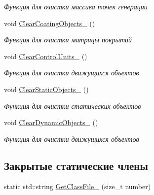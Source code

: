 \begin{DoxyCompactItemize}
\begin{DoxyCompactList}\small\item\em Функция для очистки массива точек генерации \end{DoxyCompactList}\item 
\mbox{\label{classrtm_1_1_world_controller_a8dbb12f485207fe3cddbc686b0f28797}} 
void \hyperlink{classrtm_1_1_world_controller_a8dbb12f485207fe3cddbc686b0f28797}{Clear\+Coating\+Objects\+\_\+} ()
\begin{DoxyCompactList}\small\item\em Функция для очистки матрицы покрытий \end{DoxyCompactList}\item 
\mbox{\label{classrtm_1_1_world_controller_aacf88f1ea0c2a81ed1da34a0147f32f9}} 
void \hyperlink{classrtm_1_1_world_controller_aacf88f1ea0c2a81ed1da34a0147f32f9}{Clear\+Control\+Units\+\_\+} ()
\begin{DoxyCompactList}\small\item\em Функция для очистки движущихся объектов \end{DoxyCompactList}\item 
\mbox{\label{classrtm_1_1_world_controller_a0f6b29410a02d1fa480fdec29e9b5827}} 
void \hyperlink{classrtm_1_1_world_controller_a0f6b29410a02d1fa480fdec29e9b5827}{Clear\+Static\+Objects\+\_\+} ()
\begin{DoxyCompactList}\small\item\em Функция для очистки статических объектов \end{DoxyCompactList}\item 
\mbox{\label{classrtm_1_1_world_controller_ad32b6c19479b509c06c8b03364e707af}} 
void \hyperlink{classrtm_1_1_world_controller_ad32b6c19479b509c06c8b03364e707af}{Clear\+Dynamic\+Objects\+\_\+} ()
\begin{DoxyCompactList}\small\item\em Функция для очистки движущихся объектов \end{DoxyCompactList}\end{DoxyCompactItemize}
\subsection*{Закрытые статические члены}
\begin{DoxyCompactItemize}
\item 
static std\+::string \hyperlink{classrtm_1_1_world_controller_a0f1868e663f83dcd5e31a056cfafb0f5}{Get\+Class\+File\+\_\+} (size\+\_\+t number)
\end{DoxyCompactItemize}
